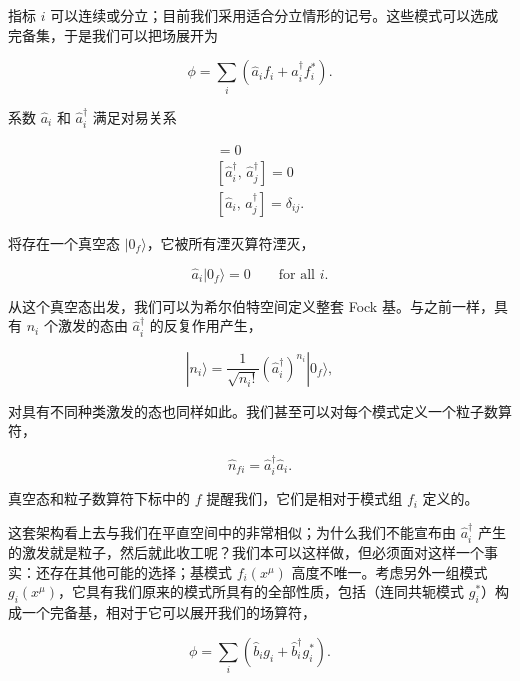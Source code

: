 指标 $i$ 可以连续或分立；目前我们采用适合分立情形的记号。这些模式可以选成完备集，于是我们可以把场展开为

\begin{equation*}
\phi = \sum_i\left(\hat{a}_i f_i + \hat{a}^{\dagger}_i f^{*}_i\right).
\tag{9.97}
\end{equation*}

系数 $\hat{a}_i$ 和 $\hat{a}^{\dagger}_i$ 满足对易关系

\begin{gather*}
[\hat{a}_i,\, \hat{a}_j] = 0 \\
[\hat{a}^{\dagger}_i,\, \hat{a}^{\dagger}_j] = 0 \\
[\hat{a}_i,\, \hat{a}^{\dagger}_j] = \delta_{ij}.
\tag{9.98}
\end{gather*}

将存在一个真空态 $|0_f\rangle$，它被所有湮灭算符湮灭，

\begin{equation*}
\hat{a}_i|0_f\rangle = 0 \qquad \text{for all } i.
\tag{9.99}
\end{equation*}

从这个真空态出发，我们可以为希尔伯特空间定义整套 Fock 基。与之前一样，具有 $n_i$ 个激发的态由 $\hat{a}^{\dagger}_i$ 的反复作用产生，

\begin{equation*}
|n_i\rangle = \frac{1}{\sqrt{n_i!}}\left(\hat{a}^{\dagger}_i\right)^{n_i}|0_f\rangle,
\tag{9.100}
\end{equation*}

对具有不同种类激发的态也同样如此。我们甚至可以对每个模式定义一个粒子数算符，

\begin{equation*}
\hat{n}_{fi} = \hat{a}^{\dagger}_i\hat{a}_i.
\tag{9.101}
\end{equation*}

真空态和粒子数算符下标中的 $f$ 提醒我们，它们是相对于模式组 $f_i$ 定义的。

这套架构看上去与我们在平直空间中的非常相似；为什么我们不能宣布由 $\hat{a}^{\dagger}_i$ 产生的激发就是粒子，然后就此收工呢？我们本可以这样做，但必须面对这样一个事实：还存在其他可能的选择；基模式 $f_i(x^{\mu})$ 高度不唯一。考虑另外一组模式 $g_i(x^{\mu})$，它具有我们原来的模式所具有的全部性质，包括（连同共轭模式 $g^{*}_i$）构成一个完备基，相对于它可以展开我们的场算符，

\begin{equation*}
\phi = \sum_i\left(\hat{b}_i g_i + \hat{b}^{\dagger}_i g^{*}_i\right).
\tag{9.102}
\end{equation*}

